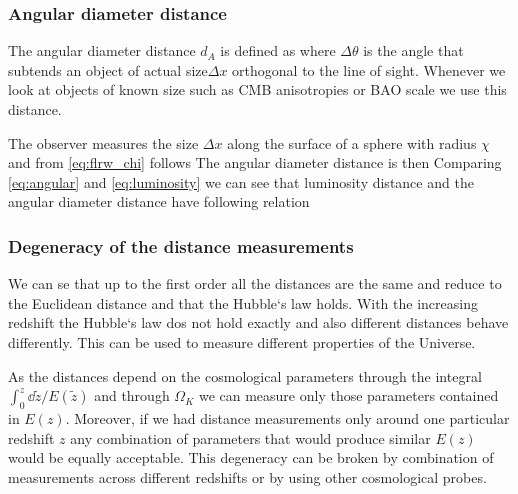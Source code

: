 \subsubsection{Angular diameter distance}
The angular diameter distance $d_A$ is defined as
where $\Delta\theta$ is the angle that subtends an object of actual size$\Delta x$ orthogonal to the line of sight. Whenever we look at objects of known size such as CMB anisotropies or BAO scale we use this distance.

The observer measures the size $\Delta x$ along the surface of a sphere with radius $\chi$ and from \autoref{eq:flrw_chi} follows
The angular diameter distance is then
Comparing \autoref{eq:angular} and \autoref{eq:luminosity} we can see that luminosity distance and the angular diameter distance have following relation
\subsubsection{Degeneracy of the distance measurements}
We can se that up to the first order all the distances are the same and reduce to the Euclidean distance and that the Hubble`s law holds. With the increasing redshift the Hubble`s law dos not hold exactly and also different distances behave differently. This can be used to measure different properties of the Universe.

As the distances depend on the cosmological parameters through the integral $\int_0^z{\dd\tilde z/E(\tilde z)}$ and through $\Omega_K$ we can measure only those parameters contained in $E(z)$. Moreover, if we had distance measurements only around one particular redshift $z$ any combination of parameters that would produce similar $E(z)$ would be equally acceptable. This degeneracy can be broken by combination of measurements across different redshifts or by using other cosmological probes.




